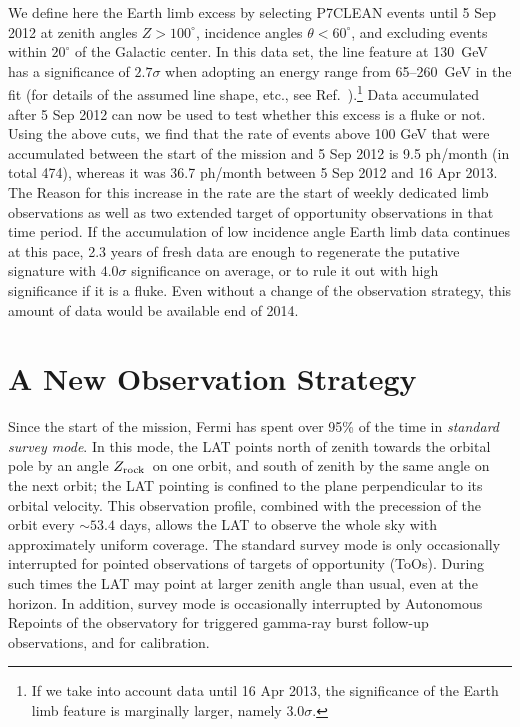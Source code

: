 \documentclass[aps,prd,superscriptaddress,showpacs,nofootinbib,fixlfloat, 12pt]{revtex4-1}
\newcommand{\Fermi}{{\slshape Fermi}}
\newcommand{\degree}{^{\rm o}}
\newcommand{\zrock}{$Z_{\rm rock}$}
\begin{document}
We define here the Earth limb excess by selecting P7CLEAN events until 5 Sep 2012 at zenith angles $Z>100^\circ$,
incidence angles $\theta<60^\circ$, and excluding events within $20^\circ$ of
the Galactic center. In this data set, the line feature at 130~GeV has a
significance of $2.7\sigma$ when
adopting an energy range from 65--260~GeV in the fit (for details of the
assumed line shape, etc.,
see Ref.~\cite{finkbeiner_systematics}).\footnote{If we take into account data
  until 16 Apr 2013, the
significance of the Earth limb feature is marginally larger, namely
$3.0\sigma$.} Data accumulated after 5 Sep 2012 can
now be used to test whether this excess is a fluke or not. Using the above
cuts, we find that the rate of events above 100 GeV that were accumulated between the
start of the mission and 5 Sep 2012 is 9.5 ph/month (in total 474), whereas it
was 36.7 ph/month between 5 Sep 2012 and 16 Apr 2013. The Reason for this increase
in the rate are the start of weekly dedicated limb observations as well as two extended
target of opportunity observations in that time period. If the accumulation of
low incidence angle Earth limb data continues at this pace, 2.3 years of fresh
data are enough to regenerate the putative signature with $4.0\sigma$
significance on average, or to rule it out with high significance if it is a
fluke. Even without a change of the observation strategy, this amount of data
would be available end of 2014.

\section{A New Observation Strategy}
Since the start of the mission, Fermi has spent over 95\% of the time in
\emph{standard survey mode}.
In this mode, the LAT points north of zenith towards the orbital pole by an
angle \zrock\ on one orbit, and south of zenith by the same angle on the next
orbit; the LAT pointing is confined to the plane perpendicular to its orbital
velocity. 
This observation profile, combined with the precession of the orbit every
$\sim53.4$ days, allows the LAT to observe the whole sky with approximately
uniform coverage. The standard survey mode is only occasionally interrupted
for pointed observations of targets of opportunity (ToOs). During such times
the LAT may point at larger zenith angle than usual, even at the horizon.  In
addition, survey mode is occasionally interrupted by Autonomous Repoints of
the observatory for triggered gamma-ray burst follow-up observations, and for
calibration.
\end{document}
